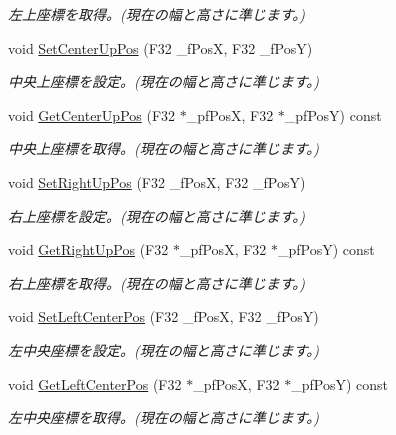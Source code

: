 \begin{DoxyCompactItemize}
\begin{DoxyCompactList}\small\item\em 左上座標を取得。(現在の幅と高さに準じます。) \end{DoxyCompactList}\item 
void \hyperlink{class_c_rect_a6060586bb7b3b41eebf238185dfdba8b}{Set\+Center\+Up\+Pos} (F32 \+\_\+f\+Pos\+X, F32 \+\_\+f\+Pos\+Y)
\begin{DoxyCompactList}\small\item\em 中央上座標を設定。(現在の幅と高さに準じます。) \end{DoxyCompactList}\item 
void \hyperlink{class_c_rect_a114a09c379ff3c6707f683401225d4c8}{Get\+Center\+Up\+Pos} (F32 $\ast$\+\_\+pf\+Pos\+X, F32 $\ast$\+\_\+pf\+Pos\+Y) const 
\begin{DoxyCompactList}\small\item\em 中央上座標を取得。(現在の幅と高さに準じます。) \end{DoxyCompactList}\item 
void \hyperlink{class_c_rect_aca3cc385d30de4b5f7f67e85c725d6af}{Set\+Right\+Up\+Pos} (F32 \+\_\+f\+Pos\+X, F32 \+\_\+f\+Pos\+Y)
\begin{DoxyCompactList}\small\item\em 右上座標を設定。(現在の幅と高さに準じます。) \end{DoxyCompactList}\item 
void \hyperlink{class_c_rect_a0f9f026a6e7a493e333186f36cd5dc9c}{Get\+Right\+Up\+Pos} (F32 $\ast$\+\_\+pf\+Pos\+X, F32 $\ast$\+\_\+pf\+Pos\+Y) const 
\begin{DoxyCompactList}\small\item\em 右上座標を取得。(現在の幅と高さに準じます。) \end{DoxyCompactList}\item 
void \hyperlink{class_c_rect_a635abc68965cbf8d5398b83ad8e16048}{Set\+Left\+Center\+Pos} (F32 \+\_\+f\+Pos\+X, F32 \+\_\+f\+Pos\+Y)
\begin{DoxyCompactList}\small\item\em 左中央座標を設定。(現在の幅と高さに準じます。) \end{DoxyCompactList}\item 
void \hyperlink{class_c_rect_afc83f3426f39f457bf288fafce983a49}{Get\+Left\+Center\+Pos} (F32 $\ast$\+\_\+pf\+Pos\+X, F32 $\ast$\+\_\+pf\+Pos\+Y) const 
\begin{DoxyCompactList}\small\item\em 左中央座標を取得。(現在の幅と高さに準じます。) \end{DoxyCompactList}\item 

\end{DoxyCompactItemize}

